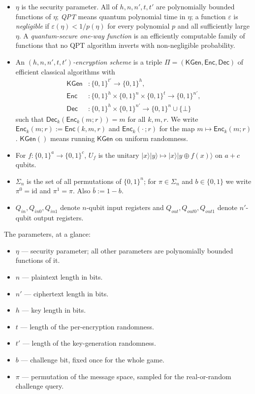 \documentclass{conjura-conjecture}
\newcommand{\KGen}{\mathsf{KGen}}
\newcommand{\Enc}{\mathsf{Enc}}
\newcommand{\Dec}{\mathsf{Dec}}
\newcommand{\ket}[1]{|#1\rangle}
\begin{document}
\begin{itemize}
  \item $\eta$ is the security parameter. All of $h,n,n',t,t'$ are
    polynomially bounded functions of $\eta$; \emph{QPT} means quantum
    polynomial time in $\eta$; a function $\varepsilon$ is
    \emph{negligible} if $\varepsilon(\eta)<1/p(\eta)$ for every
    polynomial $p$ and all sufficiently large $\eta$. A
    \emph{quantum-secure one-way function} is an efficiently computable
    family of functions that no QPT algorithm inverts with
    non-negligible probability.
  \item An \emph{$(h,n,n',t,t')$-encryption scheme} is a triple
    $\Pi=(\KGen,\Enc,\Dec)$ of efficient classical algorithms with
    \begin{align*}
      \KGen&\colon\{0,1\}^{t'}\to\{0,1\}^{h},\\
      \Enc&\colon\{0,1\}^{h}\times\{0,1\}^{n}\times\{0,1\}^{t}
        \to\{0,1\}^{n'},\\
      \Dec&\colon\{0,1\}^{h}\times\{0,1\}^{n'}
        \to\{0,1\}^{n}\cup\{\bot\}
    \end{align*}
    such that $\Dec_k(\Enc_k(m;r))=m$ for all $k,m,r$. We write
    $\Enc_k(m;r):=\Enc(k,m,r)$ and $\Enc_k(\cdot\,;r)$ for the map
    $m\mapsto\Enc_k(m;r)$. $\KGen()$ means running $\KGen$ on uniform
    randomness.
  \item For $f:\{0,1\}^{a}\to\{0,1\}^{c}$, $U_f$ is the unitary
    $\ket{x}\ket{y}\mapsto\ket{x}\ket{y\oplus f(x)}$ on $a+c$ qubits.
  \item $\Sigma_n$ is the set of all permutations of $\{0,1\}^{n}$; for
    $\pi\in\Sigma_n$ and $b\in\{0,1\}$ we write $\pi^{0}=\mathrm{id}$
    and $\pi^{1}=\pi$. Also $\bar b:=1-b$.
  \item $Q_{in},Q_{in0},Q_{in1}$ denote $n$-qubit input registers and
    $Q_{out},Q_{out0},Q_{out1}$ denote $n'$-qubit output registers.
\end{itemize}

The parameters, at a glance:

\begin{itemize}
  \item $\eta$ --- security parameter; all other parameters are
    polynomially bounded functions of it.
  \item $n$ --- plaintext length in bits.
  \item $n'$ --- ciphertext length in bits.
  \item $h$ --- key length in bits.
  \item $t$ --- length of the per-encryption randomness.
  \item $t'$ --- length of the key-generation randomness.
  \item $b$ --- challenge bit, fixed once for the whole game.
  \item $\pi$ --- permutation of the message space, sampled for the
    real-or-random challenge query.
\end{itemize}
\end{document}
